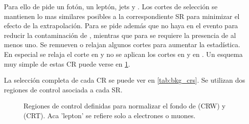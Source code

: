 
Para ello de pide un fotón, un leptón, jets y \met. Los cortes de selección se
mantienen lo mas similares posibles a la correspondiente SR para minimizar el
efecto de la extrapolación. Para {\CRW} se pide además que no haya {\bjets} en
el evento para reducir la contaminación de {\ttgam}, mientras que para {\CRT} se
requiere la presencia de al menos uno. Se remueven o relajan algunos cortes para
aumentar la estadística. En especial se relaja el corte en {\met} y no se
aplican los cortes en {\HT} y en {\rt}. Un esquema muy simple de estas CR
puede verse en \cref{fig:bkg_crt_crw}.

La selección completa de cada CR se puede ver en \cref{tab:bkg_crs}. Se utilizan
dos regiones de control asociada a cada SR.

\begin{figure}[!htbp]
  \centering

  \resizebox{0.5\textwidth}{!}{}

  \caption{Regiones de control definidas para normalizar el fondo de {\wgam} (CRW) y {\ttgam} (CRT). Aca 'lepton' se refiere solo a electrones o muones.}
  \label{fig:bkg_crt_crw}
\end{figure}



